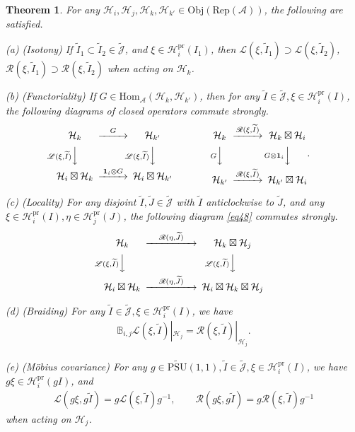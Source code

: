 \documentclass[12pt,a4paper]{article}
\theoremstyle{definition}
\theoremstyle{plain}
\newtheorem{thm}[df]{Theorem}
\newcommand{\mc}{\mathcal}
\newcommand{\wtd}{\widetilde}
\newcommand{\id}{\mathbf{1}}
\newcommand{\Hom}{\mathrm{Hom}}
\newcommand{\UPSU}{\widetilde{\mathrm{PSU}}(1,1)}
\newcommand{\scr}{\mathscr}
\newcommand{\Jtd}{\widetilde{\mathcal J}}
\newcommand{\RepA}{\mathrm{Rep}(\mc A)}
\newcommand{\mbb}{\mathbb}
\newcommand{\Obj}{\mathrm{Obj}}
\newcommand{\pr}{\mathrm{pr}}
\numberwithin{equation}{subsection}
\begin{document}
\begin{thm}\label{lb13}
	For any $\mc H_i,\mc H_j,\mc H_k,\mc H_{k'}\in\Obj(\RepA)$, the following are satisfied.
	
	(a) (Isotony) If $\wtd I_1\subset\wtd I_2\in\Jtd$, and $\xi\in\mc H_i^\pr(I_1)$, then $\scr L(\xi,\wtd I_1)\supset \scr L(\xi,\wtd I_2)$, $\scr R(\xi,\wtd I_1)\supset \scr R(\xi,\wtd I_2)$ when acting on   $\mc H_k$.
	
	(b) (Functoriality) If $G\in\Hom_{\mc A}(\mc H_k,\mc H_{k'})$, then for any $\wtd I\in\Jtd,\xi\in\mc H_i^\pr(I)$, the following diagrams of closed operators commute strongly.
	\begin{gather}
	\begin{CD}
	\mc H_k @>G>> \mc H_{k'}\\
	@V \scr L(\xi,\wtd I)  VV @V \scr L(\xi,\wtd I)  VV\\
	\mc H_i\boxtimes\mc H_k @> \id_i\otimes G>> \mc H_i\boxtimes\mc H_{k'}
	\end{CD}\qquad\qquad
	\begin{CD}
	\mc H_k @> \scr R(\xi,\wtd I)  >> \mc H_k\boxtimes\mc H_i\\
	@V G VV @V G\otimes\id_i  VV\\
	\mc H_{k'} @>\scr R(\xi,\wtd I) >> \mc H_{k'}\boxtimes\mc H_i
	\end{CD}.\label{eq45}
	\end{gather}
	
	
	
	(c) (Locality) For any  disjoint $\wtd I,\wtd J\in\Jtd$ with $\wtd I$ anticlockwise to $\wtd J$, and any $\xi\in\mc H_i^\pr(I),\eta\in\mc H_j^\pr(J)$, the following diagram \eqref{eq48}  commutes strongly.
	\begin{align}
	\begin{CD}
	\mc H_k @> \quad \scr R(\eta,\wtd J)\quad   >> \mc H_k\boxtimes\mc H_j\\
	@V \scr L(\xi,\wtd I)   V  V @V \scr L(\xi,\wtd I) VV\\
	\mc H_i\boxtimes\mc H_k @> \quad \scr R(\eta,\wtd J) \quad  >> \mc H_i\boxtimes\mc H_k\boxtimes\mc H_j
	\end{CD}\label{eq48}
	\end{align}
	
	
	(d) (Braiding) For any $\wtd I\in\Jtd,\xi\in\mc H_i^\pr(I)$, we have
	\begin{align}
	\mbb B_{i,j} \scr L(\xi,\wtd I)|_{\mc H_j}=\scr R(\xi,\wtd I)|_{\mc H_j}.\label{eq49}
	\end{align}
	
	(e) (M\"obius covariance) For any $g\in\UPSU,\wtd I\in\wtd{\mc J},\xi\in\mc H_i^\pr(I)$, we have $g\xi\in\mc H_i^\pr(g I)$, and
	\begin{align}
	\scr L(g\xi,g\wtd I)=g\scr L(\xi,\wtd I)g^{-1},\qquad \scr R(g\xi,g\wtd I)=g\scr R(\xi,\wtd I)g^{-1}\label{eq46}
	\end{align}
	when acting on $\mc H_j$.
\end{thm}
\end{document}
